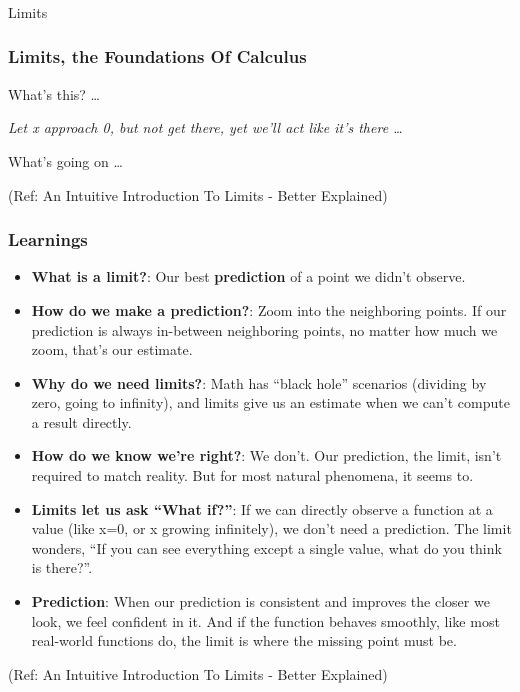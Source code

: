 
\begin{frame}[fragile]\frametitle{}
\begin{center}
{\Large Limits}
\end{center}
\end{frame}

 \begin{frame}[fragile]\frametitle{Limits, the Foundations Of Calculus}
What's this? \ldots


\begin{center}
{\it Let x approach 0, but not get there, yet we’ll act like it’s there \ldots}
\end{center}

What's going on \ldots


\tiny{(Ref: An Intuitive Introduction To Limits - Better Explained)}
\end{frame}

 \begin{frame}[fragile]\frametitle{Learnings}
\begin{itemize}
\item {\bf What is a limit?}: Our best {\bf prediction} of a point we didn’t observe.
\item {\bf How do we make a prediction?}: Zoom into the neighboring points. If our prediction is always in-between neighboring points, no matter how much we zoom, that’s our estimate.

\item {\bf Why do we need limits?}: Math has “black hole” scenarios (dividing by zero, going to infinity), and limits give us an estimate when we can’t compute a result directly.

\item {\bf How do we know we’re right?}: We don’t. Our prediction, the limit, isn’t required to match reality. But for most natural phenomena, it seems to.

\item {\bf Limits let us ask ``What if?''}: If we can directly observe a function at a value (like x=0, or x growing infinitely), we don’t need a prediction. The limit wonders, ``If you can see everything except a single value, what do you think is there?''.

\item {\bf Prediction}: When our prediction is consistent and improves the closer we look, we feel confident in it. And if the function behaves smoothly, like most real-world functions do, the limit is where the missing point must be.
\end{itemize}

\tiny{(Ref: An Intuitive Introduction To Limits - Better Explained)}


\end{frame}


